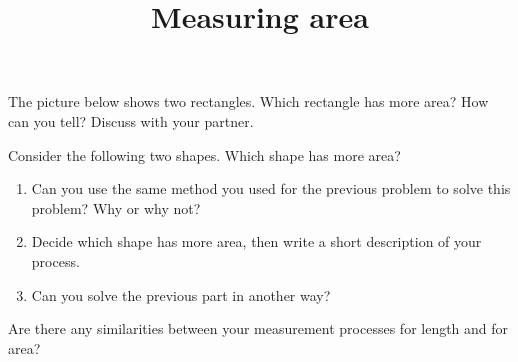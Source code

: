 \documentclass[nooutcomes,noauthor, handout]{ximera}
\title{Measuring area}
\begin{document}
\begin{abstract}\end{abstract}
\maketitle



\begin{problem}


 The picture below shows two rectangles. Which rectangle has more area?  How can you tell?  Discuss with your partner.  
\begin{image}
\end{image}
\end{problem}

\pagebreak

\begin{problem}
Consider the following two shapes.  Which shape has more area?

\begin{image}
\end{image}
   
\begin{enumerate}
    \item Can you use the same method you used for the previous problem to solve this problem? Why or why not?
    \item Decide which shape has more area, then write a short description of your process.
    \item Can you solve the previous part in another way?

\end{enumerate}
\end{problem}

\pagebreak

\begin{problem}
Are there any similarities between your measurement processes for length and for area?
\end{problem}
\vskip 2in
\end{document}

